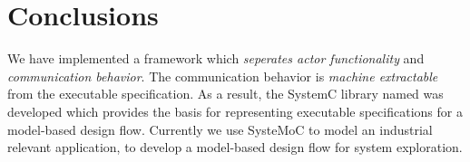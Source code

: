\section{Conclusions}\label{sec:conclusions}

We have implemented a framework which \emph{seperates actor functionality} and \emph{communication behavior}.
The communication behavior is \emph{machine extractable} from the executable specification.
As a result, the SystemC library named \SysteMoC{} was developed which provides the basis for representing executable specifications for a model-based design flow.
Currently we use SysteMoC to model an industrial relevant application, to develop a model-based design flow for system exploration.

